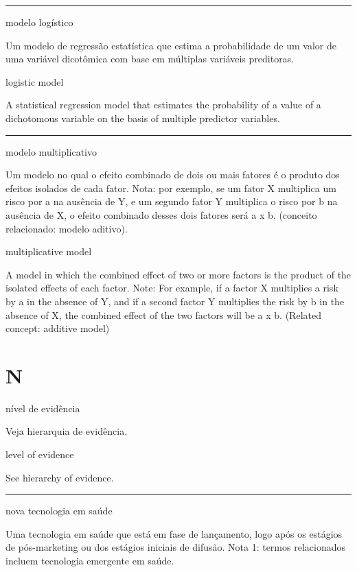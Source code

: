 \documentclass[
]{book}
\begin{document}
\begin{center}\rule{0.5\linewidth}{0.5pt}\end{center}

modelo logístico

Um modelo de regressão estatística que estima a probabilidade de um valor de uma variável dicotômica com base em múltiplas variáveis preditoras.

logistic model

A statistical regression model that estimates the probability of a value of a dichotomous variable on the basis of multiple predictor variables.

\begin{center}\rule{0.5\linewidth}{0.5pt}\end{center}

modelo multiplicativo

Um modelo no qual o efeito combinado de dois ou mais fatores é o produto dos efeitos isolados de cada fator. Nota: por exemplo, se um fator X multiplica um risco por a na ausência de Y, e um segundo fator Y multiplica o risco por b na ausência de X, o efeito combinado desses dois fatores será a x b. (conceito relacionado: modelo aditivo).

multiplicative model

A model in which the combined effect of two or more factors is the product of the isolated effects of each factor. Note: For example, if a factor X multiplies a risk by a in the absence of Y, and if a second factor Y multiplies the risk by b in the absence of X, the combined effect of the two factors will be a x b. (Related concept: additive model)

\hypertarget{n}{%
\chapter*{N}\label{n}}

nível de evidência

Veja hierarquia de evidência.

level of evidence

See hierarchy of evidence.

\begin{center}\rule{0.5\linewidth}{0.5pt}\end{center}

nova tecnologia em saúde

Uma tecnologia em saúde que está em fase de lançamento, logo após os estágios de pós-marketing ou dos estágios iniciais de difusão. Nota 1: termos relacionados incluem tecnologia emergente em saúde.
\end{document}
